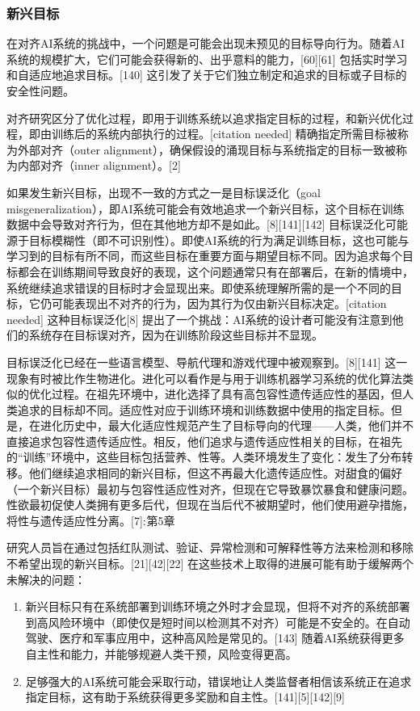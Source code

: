 \subsubsection{新兴目标}  
在对齐AI系统的挑战中，一个问题是可能会出现未预见的目标导向行为。随着AI系统的规模扩大，它们可能会获得新的、出乎意料的能力，[60][61] 包括实时学习和自适应地追求目标。[140] 这引发了关于它们独立制定和追求的目标或子目标的安全性问题。

对齐研究区分了优化过程，即用于训练系统以追求指定目标的过程，和新兴优化过程，即由训练后的系统内部执行的过程。[citation needed] 精确指定所需目标被称为外部对齐（outer alignment），确保假设的涌现目标与系统指定的目标一致被称为内部对齐（inner alignment）。[2]

如果发生新兴目标，出现不一致的方式之一是目标误泛化（goal misgeneralization），即AI系统可能会有效地追求一个新兴目标，这个目标在训练数据中会导致对齐行为，但在其他地方却不是如此。[8][141][142] 目标误泛化可能源于目标模糊性（即不可识别性）。即使AI系统的行为满足训练目标，这也可能与学习到的目标有所不同，而这些目标在重要方面与期望目标不同。因为追求每个目标都会在训练期间导致良好的表现，这个问题通常只有在部署后，在新的情境中，系统继续追求错误的目标时才会显现出来。即使系统理解所需的是一个不同的目标，它仍可能表现出不对齐的行为，因为其行为仅由新兴目标决定。[citation needed] 这种目标误泛化[8] 提出了一个挑战：AI系统的设计者可能没有注意到他们的系统存在目标误对齐，因为在训练阶段这些目标并不显现。

目标误泛化已经在一些语言模型、导航代理和游戏代理中被观察到。[8][141] 这一现象有时被比作生物进化。进化可以看作是与用于训练机器学习系统的优化算法类似的优化过程。在祖先环境中，进化选择了具有高包容性遗传适应性的基因，但人类追求的目标却不同。适应性对应于训练环境和训练数据中使用的指定目标。但是，在进化历史中，最大化适应性规范产生了目标导向的代理——人类，他们并不直接追求包容性遗传适应性。相反，他们追求与遗传适应性相关的目标，在祖先的“训练”环境中，这些目标包括营养、性等。人类环境发生了变化：发生了分布转移。他们继续追求相同的新兴目标，但这不再最大化遗传适应性。对甜食的偏好（一个新兴目标）最初与包容性适应性对齐，但现在它导致暴饮暴食和健康问题。性欲最初促使人类拥有更多后代，但现在当后代不被期望时，他们使用避孕措施，将性与遗传适应性分离。[7]: 第5章 

研究人员旨在通过包括红队测试、验证、异常检测和可解释性等方法来检测和移除不希望出现的新兴目标。[21][42][22] 在这些技术上取得的进展可能有助于缓解两个未解决的问题：
\begin{enumerate}
\item 新兴目标只有在系统部署到训练环境之外时才会显现，但将不对齐的系统部署到高风险环境中（即使仅是短时间以检测其不对齐）可能是不安全的。在自动驾驶、医疗和军事应用中，这种高风险是常见的。[143] 随着AI系统获得更多自主性和能力，并能够规避人类干预，风险变得更高。
\item 足够强大的AI系统可能会采取行动，错误地让人类监督者相信该系统正在追求指定目标，这有助于系统获得更多奖励和自主性。[141][5][142][9]
\end{enumerate}
